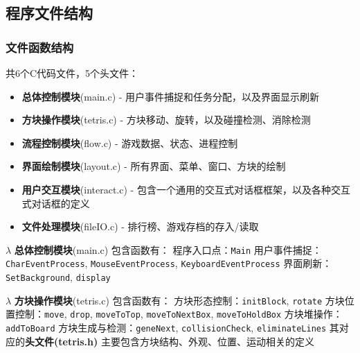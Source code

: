 \documentclass{style/ucasproposal}
\newcommand{\cinline}[1]{\texttt{#1}}
\begin{document}
\subsection{程序文件结构}
\subsubsection{文件函数结构}

共6个C代码文件，5个头文件：

\begin{itemize}
    \item \textbf{总体控制模块}(main.c)     - 用户事件捕捉和任务分配，以及界面显示刷新
    \item \textbf{方块操作模块}(tetris.c)   - 方块移动、旋转，以及碰撞检测、消除检测
    \item \textbf{流程控制模块}(flow.c)     - 游戏数据、状态、进程控制
    \item \textbf{界面绘制模块}(layout.c)   - 所有界面、菜单、窗口、方块的绘制
    \item \textbf{用户交互模块}(interact.c) - 包含一个通用的交互式对话框框架，以及各种交互式对话框的定义
    \item \textbf{文件处理模块}(fileIO.c)   - 排行榜、游戏存档的存入/读取
\end{itemize}

$\lambda$\newline
\textbf{总体控制模块}(main.c) 包含函数有：\newline
程序入口点：\cinline{Main}\newline
用户事件捕捉：\cinline{CharEventProcess}, \cinline{MouseEventProcess}, \cinline{KeyboardEventProcess}\newline
界面刷新：\cinline{SetBackground}, \cinline{display}

$\lambda$\newline
\textbf{方块操作模块}(tetris.c) 包含函数有：\newline
方块形态控制：\cinline{initBlock}, \cinline{rotate}\newline
方块位置控制：\cinline{move}, \cinline{drop}, \cinline{moveToTop}, \cinline{moveToNextBox}, \cinline{moveToHoldBox}\newline
方块堆操作：\cinline{addToBoard}\newline
方块生成与检测：\cinline{geneNext}, \cinline{collisionCheck}, \cinline{eliminateLines}\newline
其对应的\textbf{头文件(tetris.h)} 主要包含方块结构、外观、位置、运动相关的定义
\end{document}
